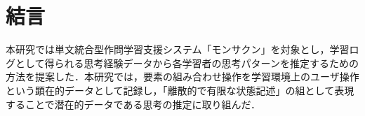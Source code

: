 \section{結言}

本研究では単文統合型作問学習支援システム「モンサクン」を対象とし，学習ログとして得られる思考経験データから各学習者の思考パターンを推定するための方法を提案した．本研究では，要素の組み合わせ操作を学習環境上のユーザ操作という顕在的データとして記録し，「離散的で有限な状態記述」の組として表現することで潜在的データである思考の推定に取り組んだ．
